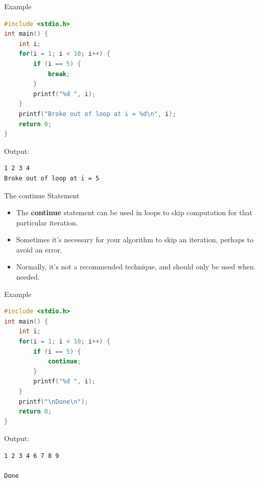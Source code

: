 \documentclass[graphics]{beamer}
\begin{document}
\begin{frame}[fragile]{Example}
    \begin{lstlisting}[language=C,basicstyle=\footnotesize,keywordstyle=\color{blue},commentstyle=\color{green},showstringspaces=false,stringstyle=\color{red}]
#include <stdio.h>
int main() {
    int i;
    for(i = 1; i < 10; i++) {
        if (i == 5) {
            break;
        }
        printf("%d ", i);
    }
    printf("Broke out of loop at i = %d\n", i);
    return 0;
}
    \end{lstlisting}
    Output:
    \begin{verbatim}
1 2 3 4
Broke out of loop at i = 5
    \end{verbatim}
\end{frame}

\begin{frame}{The continue Statement}
    \begin{itemize}
        \item The \textbf{continue} statement can be used in loops to skip computation for that particular iteration.
        \item Sometimes it's necessary for your algorithm to skip an iteration, perhaps to avoid an error.
        \item Normally, it's not a recommended technique, and should only be used when needed.
    \end{itemize}
\end{frame}

\begin{frame}[fragile]{Example}
    \begin{lstlisting}[language=C,basicstyle=\footnotesize,keywordstyle=\color{blue},commentstyle=\color{green},showstringspaces=false,stringstyle=\color{red}]
#include <stdio.h>
int main() {
    int i;
    for(i = 1; i < 10; i++) {
        if (i == 5) {
            continue;
        }
        printf("%d ", i);
    }
    printf("\nDone\n");
    return 0;
}
    \end{lstlisting}
    Output:
    \begin{verbatim}
1 2 3 4 6 7 8 9

Done
    \end{verbatim}
\end{frame}
\end{document}
